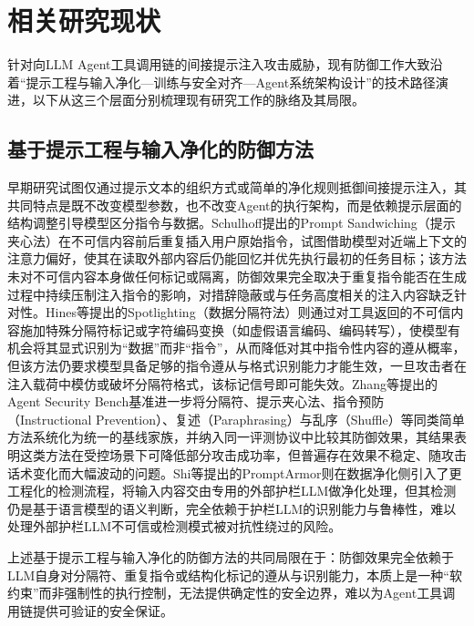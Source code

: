 ﻿\section{相关研究现状}


针对向LLM Agent工具调用链的间接提示注入攻击威胁，现有防御工作大致沿着“提示工程与输入净化—训练与安全对齐—Agent系统架构设计”的技术路径演进，以下从这三个层面分别梳理现有研究工作的脉络及其局限。

\subsection{基于提示工程与输入净化的防御方法}

早期研究试图仅通过提示文本的组织方式或简单的净化规则抵御间接提示注入，其共同特点是既不改变模型参数，也不改变Agent的执行架构，而是依赖提示层面的结构调整引导模型区分指令与数据。Schulhoff\cite{schulhoff2024sandwich}提出的Prompt Sandwiching（提示夹心法）在不可信内容前后重复插入用户原始指令，试图借助模型对近端上下文的注意力偏好，使其在读取外部内容后仍能回忆并优先执行最初的任务目标；该方法未对不可信内容本身做任何标记或隔离，防御效果完全取决于重复指令能否在生成过程中持续压制注入指令的影响，对措辞隐蔽或与任务高度相关的注入内容缺乏针对性。Hines等\cite{hines2024defending}提出的Spotlighting（数据分隔符法）则通过对工具返回的不可信内容施加特殊分隔符标记或字符编码变换（如虚假语言编码、编码转写），使模型有机会将其显式识别为“数据”而非“指令”，从而降低对其中指令性内容的遵从概率，但该方法仍要求模型具备足够的指令遵从与格式识别能力才能生效，一旦攻击者在注入载荷中模仿或破坏分隔符格式，该标记信号即可能失效。Zhang等\cite{zhang2025asb}提出的Agent Security Bench基准进一步将分隔符、提示夹心法、指令预防（Instructional Prevention）、复述（Paraphrasing）与乱序（Shuffle）等同类简单方法系统化为统一的基线家族，并纳入同一评测协议中比较其防御效果，其结果表明这类方法在受控场景下可降低部分攻击成功率，但普遍存在效果不稳定、随攻击话术变化而大幅波动的问题。Shi等\cite{shi2025promptarmor}提出的PromptArmor则在数据净化侧引入了更工程化的检测流程，将输入内容交由专用的外部护栏LLM做净化处理，但其检测仍是基于语言模型的语义判断，完全依赖于护栏LLM的识别能力与鲁棒性，难以处理外部护栏LLM不可信或检测模式被对抗性绕过的风险。

上述基于提示工程与输入净化的防御方法的共同局限在于：防御效果完全依赖于LLM自身对分隔符、重复指令或结构化标记的遵从与识别能力，本质上是一种“软约束”而非强制性的执行控制，无法提供确定性的安全边界，难以为Agent工具调用链提供可验证的安全保证。

